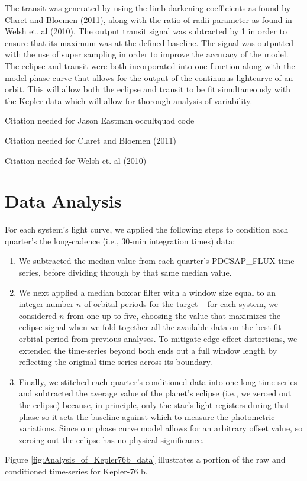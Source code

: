 \documentclass[manuscript]{aastex}
\begin{document}
    The transit was generated by using the limb darkening coefficients as found by Claret and Bloemen (2011), along with the ratio of radii parameter as found in Welsh et. al (2010). The output transit signal was subtracted by 1 in order to ensure that its maximum was at the defined baseline. The signal was outputted with the use of super sampling in order to improve the accuracy of the model. 
    The eclipse and transit were both incorporated into one function along with the model phase curve that allows for the output of the continuous lightcurve of an orbit. This will allow both the eclipse and transit to be fit simultaneously with the Kepler data which will allow for thorough analysis of variability. 


Citation needed for Jason Eastman occultquad code

Citation needed for Claret and Bloemen (2011)

Citation needed for  Welsh et. al (2010)


\section{Data Analysis}
For each system's light curve, we applied the following steps to condition each quarter's the long-cadence (i.e., 30-min integration times) data:
\begin{enumerate}
\item We subtracted the median value from each quarter's PDCSAP\_FLUX time-series, before dividing through by that same median value.
\item We next applied a median boxcar filter with a window size equal to an integer number $n$ of orbital periods for the target -- for each system, we considered $n$ from one up to five, choosing the value that maximizes the eclipse signal when we fold together all the available data on the best-fit orbital period from previous analyses. To mitigate edge-effect distortions, we extended the time-series beyond both ends out a full window length by reflecting the original time-series across its boundary.
\item Finally, we stitched each quarter's conditioned data into one long time-series and subtracted the average value of the planet's eclipse (i.e., we zeroed out the eclipse) because, in principle, only the star's light registers during that phase so it sets the baseline against which to measure the photometric variations. Since our phase curve model allows for an arbitrary offset value, so zeroing out the eclipse has no physical significance.
\end{enumerate}
Figure \ref{fig:Analysis_of_Kepler76b_data} illustrates a portion of the raw and conditioned time-series for Kepler-76 b. 
\end{document}
